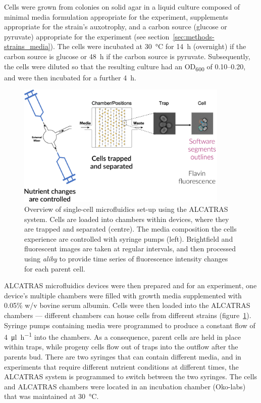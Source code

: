 Cells were grown from colonies on solid agar in a liquid culture composed of minimal media formulation appropriate for the experiment, supplements appropriate for the strain's auxotrophy, and a carbon source (glucose or pyruvate) appropriate for the experiment (see section~\ref{sec:methods-strains_media}).
The cells were incubated at \SI{30}{\celsius} for \SI{14}{\hour} (overnight) if the carbon source is glucose or \SI{48}{\hour} if the carbon source is pyruvate.
Subsequently, the cells were diluted so that the resulting culture had an OD\textsubscript{600} of 0.10--0.20, and were then incubated for a further \SI{4}{\hour}.

\begin{figure}
  \centering
  \includegraphics[width=0.9\textwidth]{microfluidics}
  \caption[
    Overview of single-cell microfluidics set-up using the ALCATRAS system
  ]{
    Overview of single-cell microfluidics set-up using the ALCATRAS system.
    Cells are loaded into chambers within devices, where they are trapped and separated (centre).
    The media composition the cells experience are controlled with syringe pumps (left).
    Brightfield and fluorescent images are taken at regular intervals, and then processed using \textit{aliby} \parencite{munozgonzalezPhenotypingSingleCells2023} to provide time series of fluorescence intensity changes for each parent cell.
  }
  \label{fig:methods-microfluidics}
\end{figure}

ALCATRAS microfluidics \parencite{craneMicrofluidicSystemStudying2014} devices were then prepared and for an experiment, one device's multiple chambers were filled with growth media supplemented with 0.05\% w/v bovine serum albumin.
Cells were then loaded into the ALCATRAS chambers --- different chambers can house cells from different strains (figure~\ref{fig:methods-microfluidics}).
Syringe pumps containing media were programmed to produce a constant flow of \SI{4}{\micro\litre~\hour^{-1}} into the chambers.
As a consequence, parent cells are held in place within traps, while progeny cells flow out of traps into the outflow after the parents bud.
There are two syringes that can contain different media, and in experiments that require different nutrient conditions at different times, the ALCATRAS system is programmed to switch between the two syringes.
The cells and ALCATRAS chambers were located in an incubation chamber (Oko-labs) that was maintained at \SI{30}{\celsius}.

